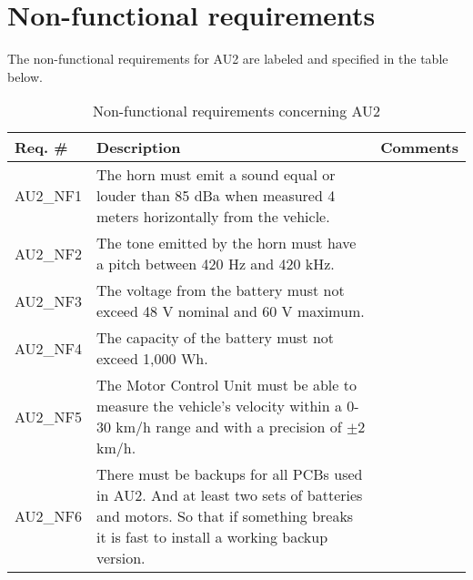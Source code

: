 \section{Non-functional requirements}
The non-functional requirements for AU2 are labeled and specified in the table below\cite{ShellRequirements}.

\begin{table}[h!]
	\centering
	\label{my-label}
	\begin{tabular}{|p{2 cm}|p{7 cm}|p{4 cm}|}
		\hline
		\textbf{Req. \#} & \textbf{Description} & \textbf{Comments} \\\hline
		AU2\_NF1	& The horn must emit a sound equal or louder than 85 dBa when measured 4 meters horizontally from the vehicle. &	\\\hline
		AU2\_NF2	& The tone emitted by the horn must have a pitch between 420 Hz and 420 kHz. &	\\\hline
		AU2\_NF3	& The voltage from the battery must not exceed 48 V nominal and 60 V maximum. &	\\\hline
		AU2\_NF4	& The capacity of the battery must not exceed 1,000 Wh. &	\\\hline
		AU2\_NF5	& The Motor Control Unit must be able to measure the vehicle's velocity within a 0-30 km/h range and with a precision of $\pm$2 km/h. &	\\\hline
		AU2\_NF6	& There must be backups for all PCBs used in AU2. And at least two sets of batteries and motors. So that if something breaks it is fast to install a working backup version. &	\\\hline
	\end{tabular}
	\caption{Non-functional requirements concerning AU2}
\end{table}


